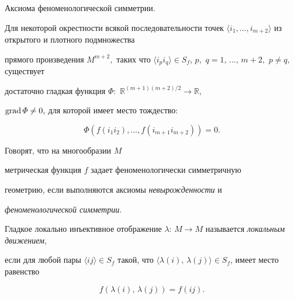 \smallskip



{\small \sc Аксиома феноменологической симметрии.} {\it  

Для некоторой окрестности всякой последовательности точек $\langle

i_1,\ldots,i_{m+2}\rangle$ из открытого и плотного подмножества

прямого произведения $M^{m+2},$ таких что $\langle i_pi_q\rangle\in S_f$, $p,$ $q = 1,\,\ldots,\,m+2,$ $p\ne q,$ существует

достаточно гладкая функция $\varPhi:$ $\mathbb R^{(m+1)(m+2)/2}\to \mathbb R,$

$\rm{grad\,}\varPhi \ne 0,$ для которой имеет место тождество\/{\rm :}

$$

\varPhi(f(i_1i_2),\ldots,f(i_{m+1}i_{m+2})) = 0.

$$

}



\smallskip



\begin{definition}[1]Говорят, что на многообразии $M$

метрическая функция $f$ задает феноменологически симметричную

геометрию, если выполняются аксиомы \textit{невырожденности} и

\textit{феноменологической симметрии}.

\end{definition}



\smallskip



\begin{definition}[2]Гладкое локально инъективное отображение $

\lambda$: $M\rightarrow M$ называется {\it локальным движением},

если для любой пары $\langle ij\rangle\in S_f$ такой, что $\langle

\lambda(i),\,\lambda(j)\rangle\in S_f$, имеет место равенство

$$

f(\lambda(i),\,\lambda(j)) = f(ij).

$$

\end{definition}



\smallskip



